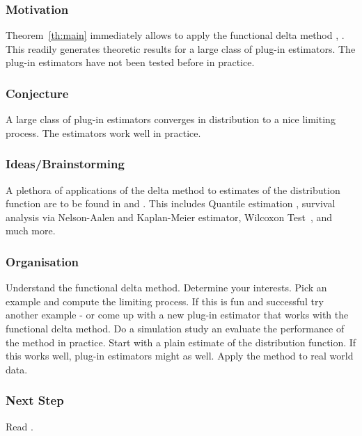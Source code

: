 \subsubsection{Motivation}
Theorem~\ref{th:main}
immediately allows to apply the functional delta method \cite[§3.9]{vaart2013}, \cite[§20]{Vaart2000}.
This readily generates theoretic results for a large class of plug-in estimators. The plug-in estimators have not been tested before in practice.
\subsubsection{Conjecture}
A large class of plug-in estimators converges in distribution to a nice limiting process.
The estimators work well in practice.
\subsubsection{Ideas/Brainstorming}
A plethora of applications of the delta method to estimates of the distribution function are to be found in \cite{Vaart2000} and \cite{vaart2013}.
This includes Quantile estimation \cite[§21]{Vaart2000}\cite[§3.9.21/24]{vaart2013},
survival analysis via Nelson-Aalen and Kaplan-Meier estimator\cite[§3.9.19/31]{vaart2013},
Wilcoxon Test~\cite[§3.9.4.1]{vaart2013},
and much more.
\subsubsection{Organisation}
Understand the functional delta method.
Determine your interests. Pick an example and compute the limiting process.
If this is fun and successful try another example - or come up with a new plug-in estimator that works with the functional delta method.
Do a simulation study an evaluate the performance of the method in practice.
Start with a plain estimate of the distribution function.
If this works well, plug-in estimators might as well.
Apply the method to real world data.
\subsubsection{Next Step}
Read \cite[§20]{Vaart2000}.
